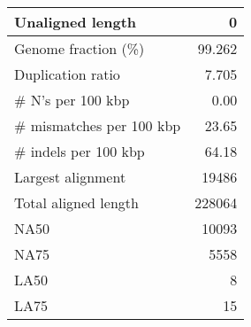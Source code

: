 \documentclass[12pt,a4paper]{article}
\begin{document}
\begin{table}[ht]
\begin{center}
\begin{tabular}{|l*{1}{|r}|}
Unaligned length & 0 \\ \hline
Genome fraction (\%) & 99.262 \\ \hline
Duplication ratio & 7.705 \\ \hline
\# N's per 100 kbp & 0.00 \\ \hline
\# mismatches per 100 kbp & 23.65 \\ \hline
\# indels per 100 kbp & 64.18 \\ \hline
Largest alignment & 19486 \\ \hline
Total aligned length & 228064 \\ \hline
NA50 & 10093 \\ \hline
NA75 & 5558 \\ \hline
LA50 & 8 \\ \hline
LA75 & 15 \\ \hline
\end{tabular}
\end{center}
\end{table}
\end{document}
